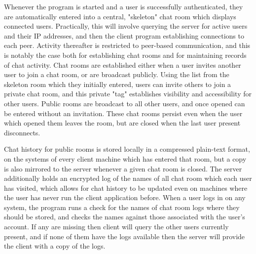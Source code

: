\documentclass[12pt]{report}
\begin{document}
\begin{flushleft}
\indent Whenever the program is started and a user is successfully authenticated, they are automatically entered into a central, "skeleton" chat room which displays connected users. Practically, this will involve querying the server for active users and their IP addresses, and then the client program establishing connections to each peer. Activity thereafter is restricted to peer-based communication, and this is notably the case both for establishing chat rooms and for maintaining records of chat activity. Chat rooms are established either when a user invites another user to join a chat room, or are broadcast publicly. Using the list from the skeleton room which they initially entered, users can invite others to join a private chat room, and this private "tag" establishes visibility and accessibility for other users. Public rooms are broadcast to all other users, and once opened can be entered without an invitation. These chat rooms persist even when the user which opened them leaves the room, but are closed when the last user present disconnects.

\indent Chat history for public rooms is stored locally in a compressed plain-text format, on the systems of every client machine which has entered that room, but a copy is also mirrored to the server whenever a given chat room is closed. The server additionally holds an encrypted log of the names of all chat room which each user has visited, which allows for chat history to be updated even on machines where the user has never run the client application before. When a user logs in on any system, the program runs a check for  the names of chat room logs where they should be stored, and checks the names against those associated with the user's account. If any are missing then client will query the other users currently present, and if none of them have the logs available then the server will provide the client with a copy of the logs.

\end{flushleft}
\end{document}
